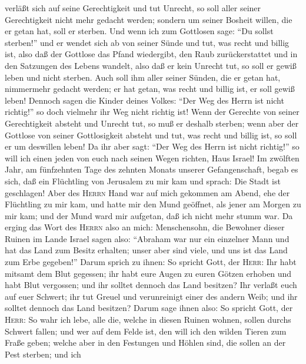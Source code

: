 verläßt sich auf seine Gerechtigkeit und tut Unrecht, so soll aller
seiner Gerechtigkeit nicht mehr gedacht werden; sondern um seiner
Bosheit willen, die er getan hat, soll er sterben.  Und
wenn ich zum Gottlosen sage: ``Du sollst sterben!'' und er wendet sich
ab von seiner Sünde und tut, was recht und billig ist, 
also daß der Gottlose das Pfand wiedergibt, den Raub zurückerstattet und
in den Satzungen des Lebens wandelt, also daß er kein Unrecht tut, so
soll er gewiß leben und nicht sterben.  Auch soll ihm
aller seiner Sünden, die er getan hat, nimmermehr gedacht werden; er hat
getan, was recht und billig ist, er soll gewiß leben! 
Dennoch sagen die Kinder deines Volkes: ``Der Weg des Herrn ist nicht
richtig!'' so doch vielmehr ihr Weg nicht richtig ist! 
Wenn der Gerechte von seiner Gerechtigkeit absteht und Unrecht tut, so
muß er deshalb sterben;  wenn aber der Gottlose von
seiner Gottlosigkeit absteht und tut, was recht und billig ist, so soll
er um deswillen leben!  Da ihr aber sagt: ``Der Weg des
Herrn ist nicht richtig!'' so will ich einen jeden von euch nach seinen
Wegen richten, Haus Israel!  Im zwölften Jahr, am
fünfzehnten Tage des zehnten Monats unserer Gefangenschaft, begab es
sich, daß ein Flüchtling von Jerusalem zu mir kam und sprach: Die Stadt
ist geschlagen!  Aber des \textsc{Herrn} Hand war auf
mich gekommen am Abend, ehe der Flüchtling zu mir kam, und hatte mir den
Mund geöffnet, als jener am Morgen zu mir kam; und der Mund ward mir
aufgetan, daß ich nicht mehr stumm war.  Da erging das
Wort des \textsc{Herrn} also an mich:  Menschensohn, die
Bewohner dieser Ruinen im Lande Israel sagen also: ``Abraham war nur ein
einzelner Mann und hat das Land zum Besitz erhalten; unser aber sind
viele, und uns ist das Land zum Erbe gegeben!''  Darum
sprich zu ihnen: So spricht Gott, der \textsc{Herr}: Ihr habt mitsamt
dem Blut gegessen; ihr habt eure Augen zu euren Götzen erhoben und habt
Blut vergossen; und ihr solltet dennoch das Land besitzen?
 Ihr verlaßt euch auf euer Schwert; ihr tut Greuel und
verunreinigt einer des andern Weib; und ihr solltet dennoch das Land
besitzen?  Darum sage ihnen also: So spricht Gott, der
\textsc{Herr}: So wahr ich lebe, alle die, welche in diesen Ruinen
wohnen, sollen durchs Schwert fallen; und wer auf dem Felde ist, den
will ich den wilden Tieren zum Fraße geben; welche aber in den Festungen
und Höhlen sind, die sollen an der Pest sterben;  und ich
